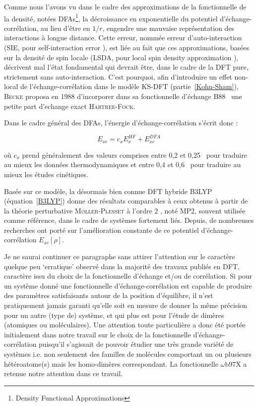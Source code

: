 	Comme nous l'avons vu dans le cadre des approximations de la fonctionnelle de la densité, notées DFAs\footnote{\og Density Functional Approximations \fg{} }, la décroissance en exponentielle du potentiel d'échange-corrélation, au lieu d'être en $1/r$, engendre une mauvaise représentation des interactions à longue distance. Cette erreur, nommée erreur d'auto-interaction (SIE, pour \og self-interaction error \fg{}), est liée au fait que ces approximations, basées sur la densité de spin locale (LSDA, pour \og local spin density approximation \fg{}), décrivent mal l'état fondamental qui devrait être, dans le cadre de la DFT pure, strictement sans auto-interaction.     
	C'est pourquoi, afin d'introduire un effet non-local de l'échange-corrélation dans le modèle KS-DFT (partie~\ref{Kohn-Sham}), \textsc{Becke} proposa en 1988 d'incorporer dans sa fonctionnelle d'échange B88~\cite{becke1988density} une petite part d'echange exact \textsc{Hartree-Fock}. 
	
	Dans le cadre général des DFAs, l'énergie d'échange-corrélation s'écrit donc :
	
	\begin{equation}
	E_{xc} = c_{x}E_{x}^{HF} + E_{xc}^{DFA}
	\label{xcB88}
	\end{equation}
	
	\noindent où $c_{x}$ prend généralement des valeurs comprises entre 0,2 et 0,25~\cite{becke1993density} pour traduire au mieux les données thermodynamiques et entre 0,4 et 0,6~\cite{boese2004development} pour traduire au mieux les études cinétiques.
	
	Basée sur ce modèle, la désormais bien connue DFT hybride B3LYP \cite{becke1993density} (équation~\ref{B3LYP}) donne des résultats comparables à ceux obtenus à partir de la théorie perturbative \textsc{M\o ller-Plesset} à l'ordre 2 \cite{moller1934note}, noté MP2, souvent utilisée comme référence, dans le cadre de systèmes fortement liés. Depuis, de nombreuses recherches ont porté sur l'amélioration constante de ce potentiel d'échange-corrélation $E_{xc}[\rho]$.
	
	Je ne saurai continuer ce paragraphe sans attirer l’attention sur le caractère quelque peu ‘erratique’ observé dans la majorité des travaux publiés en DFT, caractère issu du choix de la fonctionnelle d’échange et/ou de corrélation. Si pour un système donné une fonctionnelle d’échange-corrélation est capable de produire des paramètres satisfaisants autour de la position d’équilibre, il n’est pratiquement jamais garanti qu’elle soit en mesure de donner la même précision pour un autre (type de) système, et qui plus est pour l’étude de dimères (atomiques ou moléculaires). Une attention toute particulière a donc été portée initialement dans notre travail sur le choix de la fonctionnelle d’échange-corrélation puisqu’il s’agissait de pouvoir étudier une très grande variété de systèmes i.e. non seulement des familles de molécules comportant un ou plusieurs hétéroatome(s) mais les homo-dimères correspondant. La fonctionnelle $\omega$b97X a retenue notre attention dans ce travail.
	
